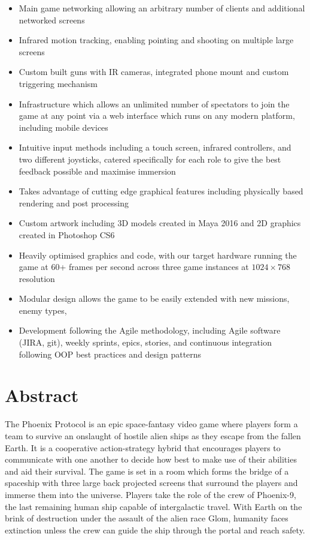 \documentclass[a4paper,11pt]{article}
\begin{document}
\begin{itemize}
  \large

  \item Main game networking allowing an arbitrary number of clients and additional networked screens
  \item Infrared motion tracking, enabling pointing and shooting on multiple large screens
  \item Custom built guns with IR cameras, integrated phone mount and custom triggering mechanism
  \item Infrastructure which allows an unlimited number of spectators to join the game at any point via a web interface which runs on any modern platform, including mobile devices
  \item Intuitive input methods including a touch screen, infrared controllers, and two different joysticks, catered specifically for each role to give the best feedback possible and maximise immersion 
  \item Takes advantage of cutting edge graphical features including physically based rendering and post processing
  \item Custom artwork including 3D models created in Maya 2016 and 2D graphics created in Photoshop CS6
  \item Heavily optimised graphics and code, with our target hardware running the game at 60+ frames per second across three game instances at $1024 \times 768$ resolution
    \item Modular design allows the game to be easily extended with new missions, enemy types, 
  \item Development following the Agile methodology, including Agile software (JIRA, git), weekly sprints, epics, stories, and continuous integration following OOP best practices and design patterns
\end{itemize}

\section{Abstract}
The Phoenix Protocol is an epic space-fantasy video game where players form a team to survive an onslaught of hostile alien ships as they escape from the fallen Earth. It is a cooperative action-strategy hybrid that encourages players to communicate with one another to decide how best to make use of their abilities and aid their survival. The game is set in a room which forms the bridge of a spaceship with three large back projected screens that surround the players and immerse them into the universe. 
Players take the role of the crew of Phoenix-9, the last remaining human ship capable of intergalactic travel. With Earth on the brink of destruction under the assault of the alien race Glom, humanity faces extinction unless the crew can guide the ship through the portal and reach safety.
\end{document}
